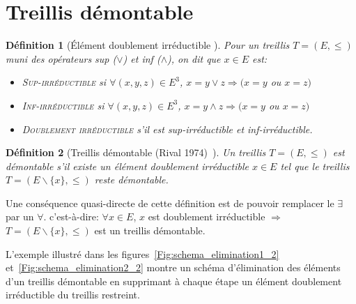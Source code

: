 \documentclass[a4paper]{report}
\newcommand{\meet}{\wedge}
\newcommand{\join}{\vee}
\newtheorem{definition}{Définition}[chapter]
\begin{document}
\label{structuresdemontables}

\section{Treillis démontable}
\label{doubleir}

\begin{definition}[\'Elément doublement irréductible ]


Pour un treillis $T = (E, \leq)$ muni des opérateurs sup ($\join$) et inf ($\meet$), on dit que $x \in E$ est: 
\begin{itemize}
 \item \textsc{Sup-irréductible}  si $\forall (x, y, z) \in E^3$, $x = y \join z \Rightarrow (x = y $ ou $ x = z)$
 \item \textsc{Inf-irréductible} si $\forall (x, y, z) \in E^3$, $x = y \meet z \Rightarrow (x = y$ ou $x = z)$
 \item \textsc{Doublement irréductible} s'il est sup-irréductible et inf-irréductible.
\end{itemize}

\end{definition}

\begin{definition}[Treillis démontable (Rival 1974)~\cite{rival1974}]

Un treillis $T = (E, \leq)$ est démontable s'il existe un élément doublement irréductible $x \in E$ tel que 
le treillis $T = (E \backslash \{x\}, \leq)$ reste démontable.
\end{definition}

Une conséquence quasi-directe de cette définition est de pouvoir remplacer le $\exists$ par un $\forall$. 
c'est-à-dire: 
$\forall x \in E$,
 $x$ est doublement irréductible $\Rightarrow$ $T = (E \backslash \{x\}, \leq)$ est un treillis démontable.

L'exemple illustré dans les figures~\ref{Fig:schema_elimination1_2} et~\ref{Fig:schema_elimination2_2} montre un schéma d'élimination des éléments d'un treillis démontable en  supprimant à chaque étape
 un élément doublement irréductible  du treillis restreint.
\end{document}

